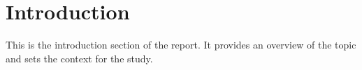 \section{Introduction}
\label{sec:introduction}

This is the introduction section of the report. It provides an overview of the topic and sets the context for the study.
